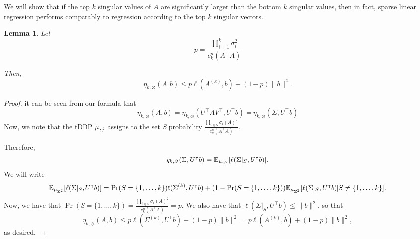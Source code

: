 \documentclass{amsart}
\newtheorem{lemma}[thm]{Lemma}
\theoremstyle{definition}
\numberwithin{equation}{section}
\begin{document}
We will show that if the top $k$ singular values of $A$ are significantly larger than the bottom $k$ singular values, then in fact, sparse linear regression performs comparably to regression according to the top $k$ singular vectors.
\begin{lemma}
    Let 
    \[
        p = \frac{\prod_{i=1}^k \sigma_i^2}{c_k^n(A^{\intercal}A)}
    \]

    Then,
    \[
        \eta_{k, \varnothing}(A, b) \le p\ell(A^{(k)}, b) + (1-p) \|b\|^2.
    \]
\end{lemma}
\begin{proof}
    it can be seen from our formula that 
    \[
        \eta_{k, \varnothing}(A, b) = 
        \eta_{k, \varnothing}(U^{\intercal}AV^{\intercal}, U^{\intercal}b) = 
        \eta_{k, \varnothing}(\Sigma, U^{\intercal}b)
    \]
    Now, we note that the tDDP $\mu_{\Sigma^2}$ assigns to the set $S$ probability $\frac{\prod_{i\in S}\sigma_i(A)^2}{c_k^n(A^{\intercal}A)}$.
    
    Therefore,
    \[
        \eta_{k, \varnothing}(\Sigma, U^{\intercal}b) = \mathbb{E}_{\mu_{\Sigma^2}}[\ell(\Sigma|_S, U^{\intercal}b)].
    \]
    We will write
    \[
        \mathbb{E}_{\mu_{\Sigma^2}}[\ell(\Sigma|_S, U^{\intercal}b)] = 
        \Pr(S = \{1 ,\dots, k\}) \ell(\Sigma^{(k)}, U^{\intercal}b) + (1-\Pr(S = \{1 ,\dots, k\}))\mathbb{E}_{\mu_{\Sigma^2}}[\ell(\Sigma|_S, U^{\intercal}b) | S \neq \{1 ,\dots, k\}].
    \]
    Now, we have that $\Pr(S = \{1 ,\dots, k\}) = \frac{\prod_{i\in S}\sigma_i(A)^2}{c_k^n(A^{\intercal}A)} = p$. We also have that $\ell(\Sigma|_S, U^{\intercal}b) \le \|b\|^2$, so that
    \[
        \eta_{k, \varnothing}(A,b) \le
        p \ell(\Sigma^{(k)}, U^{\intercal}b) + (1-p)\|b\|^2 =
        p \ell(A^{(k)}, b) + (1-p)\|b\|^2,
    \]
    as desired.
\end{proof}
\end{document}
